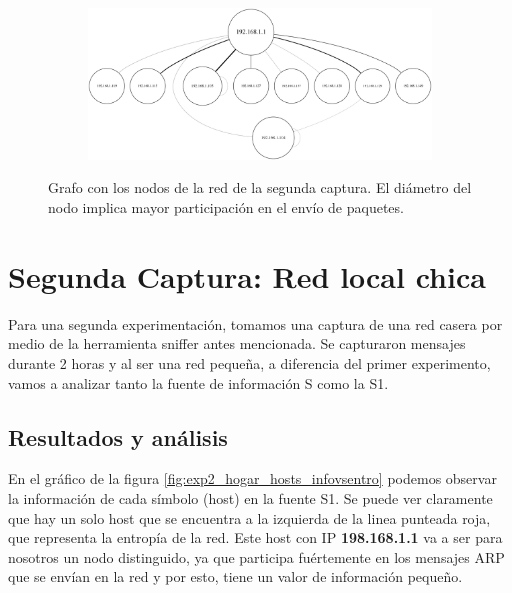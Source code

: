 \begin{figure}[ht]
  \hspace*{-0.5cm}
  \begin{subfigure}{1.1\textwidth}
    \includegraphics[width=\textwidth]{imagenes/hogarenia/grafo.png}
  \end{subfigure}
	\label{fig:exp2_hogar_grafo}
	\caption{Grafo con los nodos de la red de la segunda captura. El diámetro del nodo implica mayor participación en el envío de paquetes.}
\end{figure}

\section{Segunda Captura: Red local chica}

\par Para una segunda experimentación, tomamos una captura de una red casera por medio de la herramienta sniffer antes mencionada. Se capturaron mensajes durante 2 horas y al ser una red pequeña, a diferencia del primer experimento, vamos a analizar tanto la fuente de información S como la S1.

\subsection{Resultados y análisis}

\par En el gráfico de la figura \ref{fig:exp2_hogar_hosts_infovsentro} podemos observar la información de cada símbolo (host) en la fuente S1. Se puede ver claramente que hay un solo host que se encuentra a la izquierda de la linea punteada roja, que representa la entropía de la red. Este host con IP \textbf{198.168.1.1} va a ser para nosotros un nodo distinguido, ya que participa fuértemente en los mensajes ARP que se envían en la red y por esto, tiene un valor de información pequeño.

